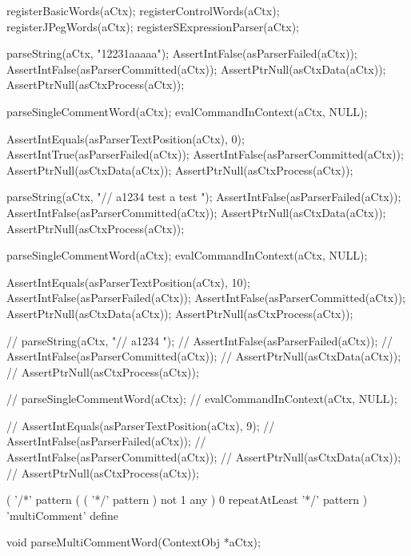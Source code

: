   registerBasicWords(aCtx);
  registerControlWords(aCtx);
  registerJPegWords(aCtx);
  registerSExpressionParser(aCtx);
\stopCTest

\startCTest
  parseString(aCtx, "12231aaaaa");
  AssertIntFalse(asParserFailed(aCtx));
  AssertIntFalse(asParserCommitted(aCtx));
  AssertPtrNull(asCtxData(aCtx));
  AssertPtrNull(asCtxProcess(aCtx));

  parseSingleCommentWord(aCtx);
  evalCommandInContext(aCtx, NULL);
  
  AssertIntEquals(asParserTextPosition(aCtx), 0);
  AssertIntTrue(asParserFailed(aCtx));
  AssertIntFalse(asParserCommitted(aCtx));
  AssertPtrNull(asCtxData(aCtx));
  AssertPtrNull(asCtxProcess(aCtx));
\stopCTest
\stopTestCase

\startCTest
  parseString(aCtx, "// a1234 \n test a test ");
  AssertIntFalse(asParserFailed(aCtx));
  AssertIntFalse(asParserCommitted(aCtx));
  AssertPtrNull(asCtxData(aCtx));
  AssertPtrNull(asCtxProcess(aCtx));
  
  parseSingleCommentWord(aCtx);
  evalCommandInContext(aCtx, NULL);

  AssertIntEquals(asParserTextPosition(aCtx), 10);
  AssertIntFalse(asParserFailed(aCtx));
  AssertIntFalse(asParserCommitted(aCtx));
  AssertPtrNull(asCtxData(aCtx));
  AssertPtrNull(asCtxProcess(aCtx));

//  parseString(aCtx, "// a1234 ");
//  AssertIntFalse(asParserFailed(aCtx));
//  AssertIntFalse(asParserCommitted(aCtx));
//  AssertPtrNull(asCtxData(aCtx));
//  AssertPtrNull(asCtxProcess(aCtx));
  
//  parseSingleCommentWord(aCtx);
//  evalCommandInContext(aCtx, NULL);

//  AssertIntEquals(asParserTextPosition(aCtx), 9);
//  AssertIntFalse(asParserFailed(aCtx));
//  AssertIntFalse(asParserCommitted(aCtx));
//  AssertPtrNull(asCtxData(aCtx));
//  AssertPtrNull(asCtxProcess(aCtx));
\stopCTest
\stopTestCase
\stopTestSuite

\startTestSuite[parseMultiCommentWord]

\starttyping
(
  '/*' pattern
  ( ( '*/' pattern ) not 1 any ) 0 repeatAtLeast
  '*/' pattern
) 'multiComment' define
\stoptyping

\startCHeader
void parseMultiCommentWord(ContextObj *aCtx);
\stopCHeader

